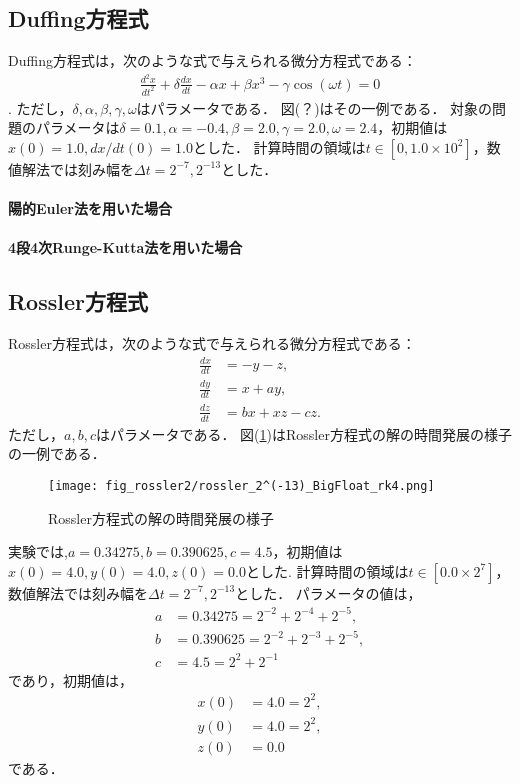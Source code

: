 \subsection{Duffing方程式}
Duffing方程式は，次のような式で与えられる微分方程式である：
\begin{align}
    \frac{d^2 x}{dt^2} + \delta\frac{dx}{dt} - \alpha x + \beta x^3 - \gamma \cos(\omega t) = 0
\end{align}.
ただし，$\delta,\alpha,\beta,\gamma,\omega$はパラメータである．
図(？)はその一例である．
対象の問題のパラメータは$\delta=0.1, \alpha=-0.4, \beta=2.0, \gamma=2.0, \omega=2.4$，初期値は$x(0) = 1.0, dx/dt(0) = 1.0$とした．
計算時間の領域は$t \in [0,1.0 \times 10^2]$，数値解法では刻み幅を$\Delta t =  2^{-7}, 2^{-13}$とした．
\paragraph*{陽的Euler法を用いた場合}

\paragraph*{4段4次Runge-Kutta法を用いた場合}

\subsection{Rossler方程式}
Rossler方程式は，次のような式で与えられる微分方程式である：
\begin{align}
    \frac{dx}{dt} &= -y-z, \\
    \frac{dy}{dt} &= x+ay, \\
    \frac{dz}{dt} &= bx + xz - cz.
\end{align}
ただし，$a,b,c$はパラメータである．
図(\ref{fig:rossler})はRossler方程式の解の時間発展の様子の一例である．
\begin{figure}[H]
    \centering
    \texttt{[image: fig\_rossler2/rossler\_2^(-13)\_BigFloat\_rk4.png]}
    \caption{Rossler方程式の解の時間発展の様子}
    \label{fig:rossler}
\end{figure}
実験では,$a=0.34275, b=0.390625, c=4.5$，初期値は$x(0) = 4.0, y(0) = 4.0, z(0) = 0.0$とした.
計算時間の領域は$t \in [0.0 \times 2^7]$，数値解法では刻み幅を$\Delta t =   2^{-7},2^{-13}$とした．
パラメータの値は，
\begin{align}
    a &= 0.34275 = 2^{-2} + 2^{-4} + 2^{-5},\\
    b &= 0.390625 = 2^{-2} + 2^{-3} + 2^{-5},\\ 
    c &= 4.5 = 2^2 + 2^{-1}
\end{align}
であり，初期値は，
\begin{align}
    x(0) &= 4.0 = 2^2,\\
    y(0) &= 4.0 = 2^2 ,\\
    z(0) &= 0.0 
\end{align}
である．

